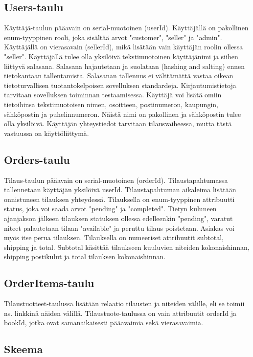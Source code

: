 \documentclass[11pt,a4paper]{article}
\begin{document}
\subsection{Users-taulu}

Käyttäjä-taulun pääavain on serial-muotoinen (userId). Käyttäjällä on pakollinen enum-tyyppinen rooli, joka sisältää arvot "customer", "seller" ja "admin". Käyttäjällä on vierasavain (sellerId), mikä lisätään vain käyttäjän roolin ollessa "seller". Käyttäjällä tulee olla yksilöivä tekstimuotoinen käyttäjänimi ja siihen liittyvä salasana. Salasana hajautetaan ja suolataan (hashing and salting) ennen tietokantaan tallentamista. Salasanan tallennus ei välttämättä vastaa oikean tietoturvallisen tuotantokelpoisen sovelluksen standardeja. Kirjautumistietoja tarvitaan sovelluksen toiminnan testaamisessa. Käyttäjä voi lisätä omiin tietoihinsa tekstimuotoisen nimen, osoitteen, postinumeron, kaupungin, sähköpostin ja puhelinnumeron. Näistä nimi on pakollinen ja sähköpostin tulee olla yksilöivä. Käyttäjän yhteystiedot tarvitaan tilausvaiheessa, mutta tästä vastuussa on käyttöliittymä.

\subsection{Orders-taulu}

Tilaus-taulun pääavain on serial-muotoinen (orderId). Tilaustapahtumassa tallennetaan käyttäjän yksilöivä userId. Tilaustapahtuman aikaleima lisätään onnistuneen tilauksen yhteydessä. Tilauksella on enum-tyyppinen attribuutti status, joka voi saada arvot "pending" ja "completed". Tietyn kuluneen ajanjakson jälkeen tilauksen statuksen ollessa edelleenkin "pending", varatut niteet palautetaan tilaan "available" ja peruttu tilaus poistetaan. Asiakas voi myös itse perua tilauksen. Tilauksella on numeeriset attribuutit subtotal, shipping ja total. Subtotal käsittää tilaukseen kuuluvien niteiden kokonaishinnan, shipping postikulut ja total tilauksen kokonaishinnan.

\subsection{OrderItems-taulu}

Tilaustuotteet-taulussa lisätään relaatio tilausten ja niteiden välille, eli se toimii ns. linkkinä näiden välillä. Tilaustuote-taulussa on vain attribuutit orderId ja bookId, jotka ovat samanaikaisesti pääavaimia sekä vierasavaimia.

\subsection{Skeema}
\end{document}
